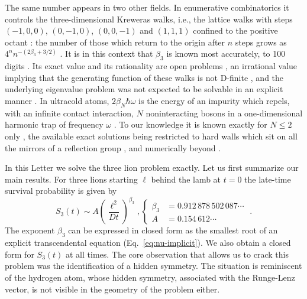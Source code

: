 \documentclass[aps,prl,twocolumn,superscriptaddress,floatfix,nofootinbib]{revtex4-2}
\begin{document}
The same number appears in two other fields. In enumerative combinatorics it controls the three-dimensional Kreweras walks, i.e., the lattice walks with steps $(-1,0,0)$, $(0,-1,0)$, $(0,0,-1)$ and $(1,1,1)$ confined to the positive octant \cite{BBKM16,BPRT20}: the number of those which return to the origin after $n$ steps grows as $4^n n^{-(2\beta_3 + 3/2)}$ \cite{DW15,BPRT20,SM}. It is in this context that $\beta_3$ is known most accurately, to 100 digits \cite{DS20}. Its exact value and its rationality are open problems \cite{BPRT20,HJR24}, an irrational value implying that the generating function of these walks is not D-finite \cite{BPRT20,DS20}, and the underlying eigenvalue problem was not expected to be solvable in an explicit manner \cite{HJR24}. In ultracold atoms, $2 \beta_N \hbar \omega$ is the energy of an impurity which repels, with an infinite contact interaction, $N$ noninteracting bosons in a one-dimensional harmonic trap of frequency $\omega$ \cite{SM}. To our knowledge it is known exactly for $N \leq 2$ only \cite{ZVFJV14}, the available exact solutions being restricted to hard walls which sit on all the mirrors of a reflection group \cite{HODVJZ17}, and numerically beyond \cite{DVZ15,RIJ24}.

In this Letter we solve the three lion problem exactly. Let us first summarize our main results. For three lions starting $\ell$ behind the lamb at $t = 0$ the late-time survival probability is given by
\begin{equation} \label{eq:main}
    S_3(t) \sim A \left( \frac{\ell^2}{D t} \right)^{\beta_3}\;, \begin{cases}
        \beta_3 &= 0.912\,878\,502\,087\cdots\\
        A &= 0.154\,612\cdots 
    \end{cases} \;.
\end{equation}
The exponent $\beta_3$ can be expressed in closed form as the smallest root of an explicit transcendental equation (Eq.~\ref{eq:nu-implicit}). We also obtain a closed form for $S_3(t)$ at all times. The core observation that allows us to crack this problem was the identification of a hidden symmetry. The situation is reminiscent of the hydrogen atom, whose
hidden symmetry, associated with the Runge-Lenz vector, is not visible in the geometry of the problem either.
\end{document}
